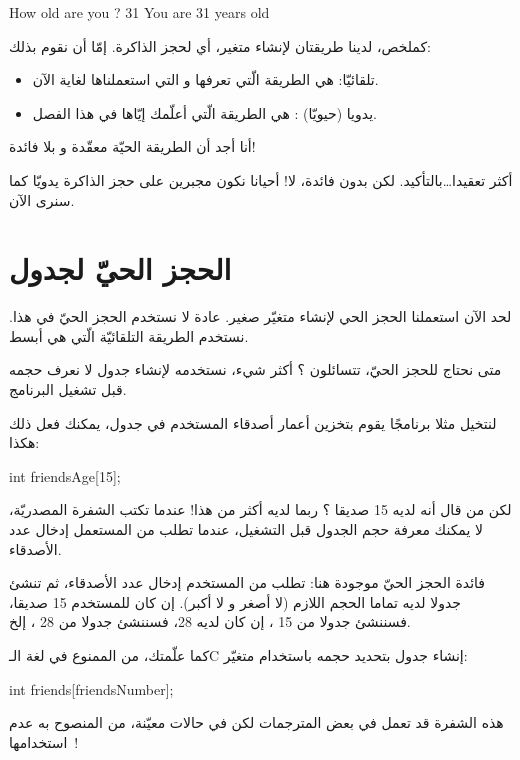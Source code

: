 \begin{Console}
How old are you ? 31
You are 31 years old
\end{Console}

كملخص، لدينا طريقتان لإنشاء متغير، أي لحجز الذاكرة. إمّا أن نقوم بذلك:
\begin{itemize}
  \item تلقائيّا: هي الطريقة الّتي تعرفها و التي استعملناها لغاية الآن.
  \item يدويا (حيويّا) : هي الطريقة الّتي أعلّمك إيّاها في هذا الفصل.
\end{itemize}

\begin{question}
أنا أجد أن الطريقة الحيّة معقّدة و بلا فائدة!
\end{question}

أكثر تعقيدا\dots بالتأكيد. لكن بدون فائدة، لا! أحيانا نكون مجبرين على حجز الذاكرة يدويّا كما سنرى الآن.

\section{الحجز الحيّ لجدول}
لحد الآن استعملنا الحجز الحي لإنشاء متغيّر صغير. عادة لا نستخدم الحجز الحيّ في هذا. نستخدم الطريقة التلقائيّة الّتي هي أبسط.

متى نحتاج للحجز الحيّ، تتسائلون ؟ أكثر شيء، نستخدمه لإنشاء جدول لا نعرف حجمه قبل تشغيل البرنامج.

لنتخيل مثلا برنامجًا يقوم بتخزين أعمار أصدقاء المستخدم في جدول، يمكنك فعل ذلك هكذا:

\begin{Csource}
int friendsAge[15];
\end{Csource}

لكن من قال أنه لديه 15 صديقا ؟ ربما لديه أكثر من هذا!
عندما تكتب الشفرة المصدريّة، لا يمكنك معرفة حجم الجدول قبل التشغيل، عندما تطلب من المستعمل إدخال عدد الأصدقاء.

فائدة الحجز الحيّ موجودة هنا: تطلب من المستخدم إدخال عدد الأصدقاء، ثم تنشئ جدولا لديه تماما الحجم اللازم (لا أصغر و لا أكبر). إن كان للمستخدم 15 صديقا، فسننشئ جدولا من 15
،
إن كان لديه 28، فسننشئ جدولا من 28
،
إلخ.

كما علّمتك، من الممنوع في لغة الـ\textenglish{C}
إنشاء جدول بتحديد حجمه باستخدام متغيّر:

\begin{Csource}
int friends[friendsNumber];
\end{Csource}

\begin{information}
هذه الشفرة قد تعمل في بعض المترجمات لكن في حالات معيّنة، من المنصوح به عدم استخدامها~!
\end{information}

